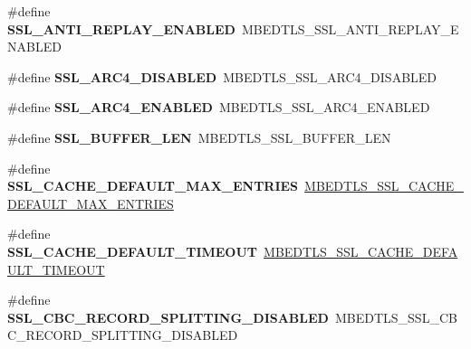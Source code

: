 \begin{DoxyCompactItemize}
\item 
\mbox{\label{compat-1_83_8h_ade0c5a5695254757948000be91355a5e}} 
\#define {\bfseries S\+S\+L\+\_\+\+A\+N\+T\+I\+\_\+\+R\+E\+P\+L\+A\+Y\+\_\+\+E\+N\+A\+B\+L\+ED}~M\+B\+E\+D\+T\+L\+S\+\_\+\+S\+S\+L\+\_\+\+A\+N\+T\+I\+\_\+\+R\+E\+P\+L\+A\+Y\+\_\+\+E\+N\+A\+B\+L\+ED
\item 
\mbox{\label{compat-1_83_8h_ab7a01e25b1da775e61a7d49802ff8cbb}} 
\#define {\bfseries S\+S\+L\+\_\+\+A\+R\+C4\+\_\+\+D\+I\+S\+A\+B\+L\+ED}~M\+B\+E\+D\+T\+L\+S\+\_\+\+S\+S\+L\+\_\+\+A\+R\+C4\+\_\+\+D\+I\+S\+A\+B\+L\+ED
\item 
\mbox{\label{compat-1_83_8h_a8c469962daad86b5f97e53036c687bdb}} 
\#define {\bfseries S\+S\+L\+\_\+\+A\+R\+C4\+\_\+\+E\+N\+A\+B\+L\+ED}~M\+B\+E\+D\+T\+L\+S\+\_\+\+S\+S\+L\+\_\+\+A\+R\+C4\+\_\+\+E\+N\+A\+B\+L\+ED
\item 
\mbox{\label{compat-1_83_8h_a70dcd2bbca08cfb787f98019dc98bad5}} 
\#define {\bfseries S\+S\+L\+\_\+\+B\+U\+F\+F\+E\+R\+\_\+\+L\+EN}~M\+B\+E\+D\+T\+L\+S\+\_\+\+S\+S\+L\+\_\+\+B\+U\+F\+F\+E\+R\+\_\+\+L\+EN
\item 
\mbox{\label{compat-1_83_8h_ad90e356ca9b417005065a25871b6bd07}} 
\#define {\bfseries S\+S\+L\+\_\+\+C\+A\+C\+H\+E\+\_\+\+D\+E\+F\+A\+U\+L\+T\+\_\+\+M\+A\+X\+\_\+\+E\+N\+T\+R\+I\+ES}~\mbox{\hyperlink{ssl__cache_8h_a03256bf3d0f0c370d6984b441b86567e}{M\+B\+E\+D\+T\+L\+S\+\_\+\+S\+S\+L\+\_\+\+C\+A\+C\+H\+E\+\_\+\+D\+E\+F\+A\+U\+L\+T\+\_\+\+M\+A\+X\+\_\+\+E\+N\+T\+R\+I\+ES}}
\item 
\mbox{\label{compat-1_83_8h_a77f926737350e8e702a8323fee6abc90}} 
\#define {\bfseries S\+S\+L\+\_\+\+C\+A\+C\+H\+E\+\_\+\+D\+E\+F\+A\+U\+L\+T\+\_\+\+T\+I\+M\+E\+O\+UT}~\mbox{\hyperlink{ssl__cache_8h_a02b027cfb82a0436a19bfeada16cb8db}{M\+B\+E\+D\+T\+L\+S\+\_\+\+S\+S\+L\+\_\+\+C\+A\+C\+H\+E\+\_\+\+D\+E\+F\+A\+U\+L\+T\+\_\+\+T\+I\+M\+E\+O\+UT}}
\item 
\mbox{\label{compat-1_83_8h_a77a734ddfdb09c3df8566bca957bfef6}} 
\#define {\bfseries S\+S\+L\+\_\+\+C\+B\+C\+\_\+\+R\+E\+C\+O\+R\+D\+\_\+\+S\+P\+L\+I\+T\+T\+I\+N\+G\+\_\+\+D\+I\+S\+A\+B\+L\+ED}~M\+B\+E\+D\+T\+L\+S\+\_\+\+S\+S\+L\+\_\+\+C\+B\+C\+\_\+\+R\+E\+C\+O\+R\+D\+\_\+\+S\+P\+L\+I\+T\+T\+I\+N\+G\+\_\+\+D\+I\+S\+A\+B\+L\+ED

\end{DoxyCompactItemize}
